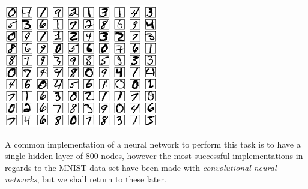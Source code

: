 \begin{Figure}
 \centering
 \includegraphics[width=0.7\linewidth]{images/mnist}
 \captionsetup{width=0.8\linewidth, font=small}
\end{Figure}

A common implementation of a neural network to perform this task is to have a single hidden layer of 800 nodes, however the most successful implementations in regards to the MNIST data set have been made with \textit{convolutional neural networks}, but we shall return to these later.

